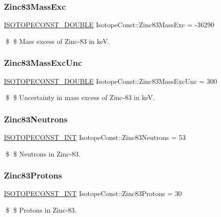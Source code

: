 \subsubsection{\texorpdfstring{Zinc83\+Mass\+Exc}{Zinc83MassExc}}
{\footnotesize\ttfamily \mbox{\hyperlink{group___isotope_const-_macros_ga8f45a7272ce02c0b4c65c44636ed719a}{I\+S\+O\+T\+O\+P\+E\+C\+O\+N\+S\+T\+\_\+\+D\+O\+U\+B\+LE}} Isotope\+Const\+::\+Zinc83\+Mass\+Exc = -\/36290}

\$ \$ Mass excess of Zinc-\/83 in keV. \mbox{\label{group___isotope_const-_zinc-_zn83_gaeaf2bfba342296facd06fc22565918cf}} 
\subsubsection{\texorpdfstring{Zinc83\+Mass\+Exc\+Unc}{Zinc83MassExcUnc}}
{\footnotesize\ttfamily \mbox{\hyperlink{group___isotope_const-_macros_ga8f45a7272ce02c0b4c65c44636ed719a}{I\+S\+O\+T\+O\+P\+E\+C\+O\+N\+S\+T\+\_\+\+D\+O\+U\+B\+LE}} Isotope\+Const\+::\+Zinc83\+Mass\+Exc\+Unc = 300}

\$ \$ Uncertainty in mass excess of Zinc-\/83 in keV. \mbox{\label{group___isotope_const-_zinc-_zn83_gada906cc4fff4a16ff703a596c58d2f37}} 
\subsubsection{\texorpdfstring{Zinc83\+Neutrons}{Zinc83Neutrons}}
{\footnotesize\ttfamily \mbox{\hyperlink{group___isotope_const-_macros_ga5f18360b3e99483a35c32d789e62621c}{I\+S\+O\+T\+O\+P\+E\+C\+O\+N\+S\+T\+\_\+\+I\+NT}} Isotope\+Const\+::\+Zinc83\+Neutrons = 53}

\$ \$ Neutrons in Zinc-\/83. \mbox{\label{group___isotope_const-_zinc-_zn83_ga8aac5c2de200ed531968e372f07abc7b}} 
\subsubsection{\texorpdfstring{Zinc83\+Protons}{Zinc83Protons}}
{\footnotesize\ttfamily \mbox{\hyperlink{group___isotope_const-_macros_ga5f18360b3e99483a35c32d789e62621c}{I\+S\+O\+T\+O\+P\+E\+C\+O\+N\+S\+T\+\_\+\+I\+NT}} Isotope\+Const\+::\+Zinc83\+Protons = 30}

\$ \$ Protons in Zinc-\/83. 